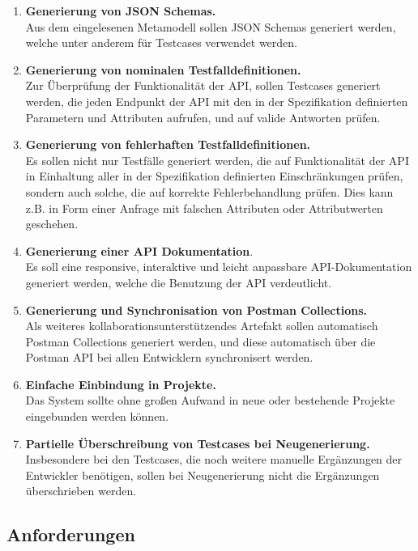 \begin{enumerate}
	\item \textbf{Generierung von JSON Schemas.} \\
	Aus dem eingelesenen Metamodell sollen JSON Schemas generiert werden, welche unter anderem für Testcases verwendet werden.
	\item \textbf{Generierung von nominalen Testfalldefinitionen.} \\
	Zur Überprüfung der Funktionalität der API, sollen Testcases generiert werden, die jeden Endpunkt der API mit den in der Spezifikation definierten Parametern und Attributen aufrufen, und auf valide Antworten prüfen.
	\item \textbf{Generierung von fehlerhaften Testfalldefinitionen.} \\
	Es sollen nicht nur Testfälle generiert werden, die auf Funktionalität der API in Einhaltung aller in der Spezifikation definierten Einschränkungen prüfen, sondern auch solche, die auf korrekte Fehlerbehandlung prüfen. Dies kann z.B. in Form einer Anfrage mit falschen Attributen oder Attributwerten geschehen.
	\item \textbf{Generierung einer API Dokumentation}. \\
	Es soll eine responsive, interaktive und leicht anpassbare API-Dokumentation generiert werden, welche die Benutzung der API verdeutlicht.
	\item \textbf{Generierung und Synchronisation von Postman Collections.} \\
	Als weiteres kollaborationsunterstützendes Artefakt sollen automatisch Postman Collections generiert werden, und diese automatisch über die Postman API bei allen Entwicklern synchronisert werden.
	\item \textbf{Einfache Einbindung in Projekte.} \\
	Das System sollte ohne großen Aufwand in neue oder bestehende Projekte eingebunden werden können.  
	\item \textbf{Partielle Überschreibung von Testcases bei Neugenerierung. } \\
	Insbesondere bei den Testcases, die noch weitere manuelle Ergänzungen der Entwickler benötigen, sollen bei Neugenerierung nicht die Ergänzungen überschrieben werden.
\end{enumerate}

\subsection{Anforderungen}

